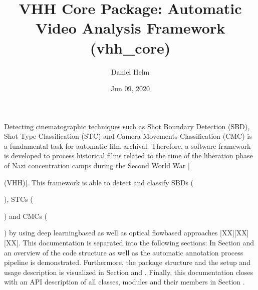 \documentclass[letterpaper,10pt,english,openany,oneside]{sphinxmanual}
\title{VHH Core Package: Automatic Video Analysis Framework (vhh\_core)}
\date{Jun 09, 2020}
\author{Daniel Helm}
\begin{document}
\pagestyle{empty}
\sphinxmaketitle
\pagestyle{plain}
\sphinxtableofcontents
\pagestyle{normal}
\label{\detokenize{index::doc}}


Detecting cinematographic techniques such as Shot Boundary Detection (SBD), Shot Type Classification (STC) and Camera
Movements Classification (CMC) is a fundamental task for automatic film archival. Therefore, a software framework is
developed to process historical films related to the time of the liberation phase of Nazi concentration camps during
the Second World War {[} %
\begin{footnote}[1]\sphinxAtStartFootnote
{}
%
\end{footnote} (VHH){]}. This framework is able to detect and classify SBDs
( %
\begin{footnote}[3]\sphinxAtStartFootnote
{}
%
\end{footnote}), STCs ( %
\begin{footnote}[4]\sphinxAtStartFootnote
{}
%
\end{footnote}) and CMCs ( %
\begin{footnote}[5]\sphinxAtStartFootnote
{}
%
\end{footnote}) by using deep learning\sphinxhyphen{}based as well as optical flow\sphinxhyphen{}based
approaches {[}XX{]}{[}XX{]}{[}XX{]}. This documentation is separated into the following sections: In Section  and
 an overview of the code structure as well as the automatic annotation process pipeline is demonstrated.
Furthermore, the package structure and the setup and usage description is visualized in Section  and
. Finally, this documentation closes with an API description of all classes, modules and their
members in Section .
\end{document}
